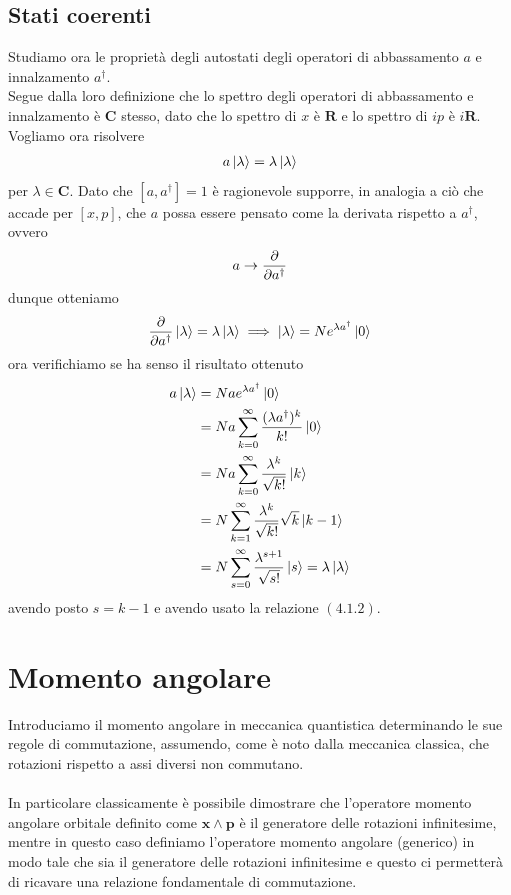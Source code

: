 \documentclass{article}
\begin{document}
\subsection{Stati coerenti}
Studiamo ora le proprietà degli autostati degli operatori di abbassamento $a$ e innalzamento $a^\dagger$. \\
Segue dalla loro definizione che lo spettro degli operatori di abbassamento e innalzamento è $\mathbf{C}$ stesso, dato che lo spettro di $x$ è $\mathbf{R}$ e lo spettro di $ip$ è $i\mathbf{R}$. \\
Vogliamo ora risolvere
\begin{gather}
    a\ket{\lambda} = \lambda\ket{\lambda} \notag
\end{gather}
per $\lambda \in \mathbf{C}$. Dato che $[a, a^\dagger] = 1$ è ragionevole supporre, in analogia a ciò che accade per $[x, p]$, che $a$ possa essere pensato come la derivata rispetto a $a^\dagger$, ovvero
\begin{gather}
    a \rightarrow \frac{\partial}{\partial a^\dagger} \notag
\end{gather}
dunque otteniamo
\begin{gather}
    \frac{\partial}{\partial a^\dagger}\ket{\lambda} = \lambda\ket{\lambda} \implies \ket{\lambda} = Ne^{\lambda a^\dagger}\ket{0} \notag
\end{gather}
ora verifichiamo se ha senso il risultato ottenuto
\begin{align}
    a\ket{\lambda} &= Nae^{\lambda a^\dagger}\ket{0} \notag \\
    &= Na \sum_{k = 0}^\infty \frac{(\lambda a^\dagger)^k}{k!}\ket{0} \notag \\
    &= Na \sum_{k = 0}^\infty \frac{\lambda^k}{\sqrt{k!}}\ket{k} \notag \\
    &= N \sum_{k = 1}^\infty \frac{\lambda^k}{\sqrt{k!}}\sqrt{k}\ket{k - 1} \notag \\
    &= N \sum_{s = 0}^\infty \frac{\lambda^{s + 1}}{\sqrt{s!}}\ket{s} = \lambda\ket{\lambda} \notag
\end{align}
avendo posto $s = k - 1$ e avendo usato la relazione $(4.1.2)$.

\newpage
\section{Momento angolare}
Introduciamo il momento angolare in meccanica quantistica determinando le sue regole di commutazione, assumendo, come è noto dalla meccanica classica, che rotazioni rispetto a assi diversi non commutano. \\ \\
In particolare classicamente è possibile dimostrare che l'operatore momento angolare orbitale definito come $\mathbf{x} \wedge \mathbf{p}$ è il generatore delle rotazioni infinitesime, mentre in questo caso definiamo l'operatore momento angolare (generico) in modo tale che sia il generatore delle rotazioni infinitesime e questo ci permetterà di ricavare una relazione fondamentale di commutazione.
\end{document}
